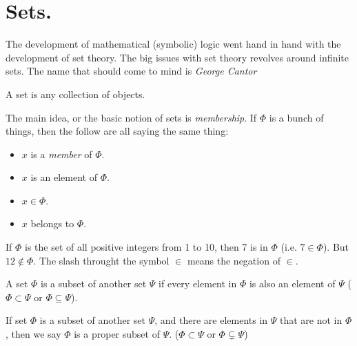 \section{Sets.}
The development of mathematical (symbolic) logic went hand in hand with the development of set theory.  The big issues with set theory revolves around infinite sets.  The name that should come to mind is \emph{George Cantor}

\begin{definition}[Set]
A set is any collection of objects.
\end{definition}

The main idea, or the basic notion of sets is \emph {membership}.  If $\Phi$ is a bunch of things, then the follow are all saying the same thing:

\begin{itemize}
\item $x$ is a \emph{member} of $\Phi$.
\item $x$ is an element of $\Phi$.
\item $x\in\Phi$.
\item $x$ belongs to $\Phi$.
\end{itemize}

\begin{example}
If $\Phi$ is the set of all positive integers from 1 to 10, then 7 is in $\Phi$ (i.e. $7\in\Phi$).  But $12\not\in\Phi$.  The slash throught the symbol $\in$ means the negation of $\in$.  
\end{example}

\begin{definition}[Subset]
A set $\Phi$ is a subset of another set $\Psi$  if every element in $\Phi$ is also an element of $\Psi$ ($\Phi\subset \Psi$ or $\Phi\subseteq \Psi$).
\end{definition}


\begin{definition}
If set $\Phi$ is a subset of another set $\Psi$, and there are elements in $\Psi$ that are not  in $\Phi$, then we say $\Phi$ is a proper subset of $\Psi$. ($\Phi\subset \Psi$ or $\Phi\subsetneq \Psi$)
\end{definition}

